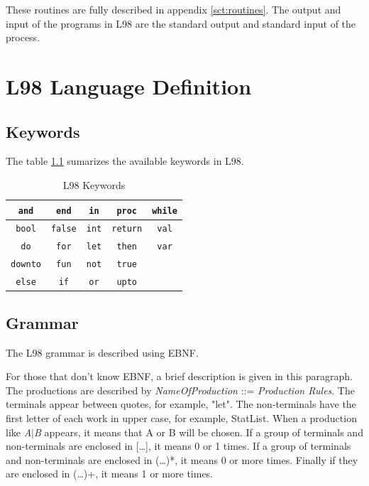 \documentclass[a4paper, 11pt]{report}
\newcommand{\keyword}[1]{\texttt{#1}}
\begin{document}
These routines are fully described in appendix \ref{sct:routines}.
The output and input of the programs in L98 are the standard output and
standard input of the process.

\appendix

\chapter{L98 Language Definition}
\section{Keywords}
The table \ref{tbl:keys} sumarizes the available keywords in L98.

\begin{table}[htb]
\center
\begin{tabular}{|c|c|c|c|c|}
 \hline
 \keyword{and} & \keyword{end} & \keyword{in} & \keyword{proc} & \keyword{while}\\
 \hline
 \keyword{bool} & \keyword{false} & \keyword{int} & \keyword{return} & \keyword{val}\\
 \hline
 \keyword{do} & \keyword{for} & \keyword{let} & \keyword{then} & \keyword{var}\\
 \hline
 \keyword{downto} & \keyword{fun} & \keyword{not} & \keyword{true} &\\
 \hline
 \keyword{else} & \keyword{if} & \keyword{or} & \keyword{upto} &\\
 \hline
\end{tabular}
\caption{L98 Keywords}
\label{tbl:keys}
\end{table}

\section{Grammar}
The L98 grammar is described using EBNF.

For those that don't know EBNF, a brief description is given in this
paragraph. The productions are described by \emph{NameOfProduction} ::=
\emph{Production Rules}. The terminals appear between quotes, for
example, "let". The non-terminals have the first letter of each
work in upper case, for example, StatList. When a production like
\emph{A$|$B} appears, it means that A or B will be chosen. If a group
of terminals and non-terminals are enclosed in [\dots], it means 0
or 1 times. If a group of terminals and non-terminals are enclosed
in (\dots)*, it means 0 or more times. Finally if they are enclosed
in (\dots)+, it means 1 or more times. 
\end{document}

